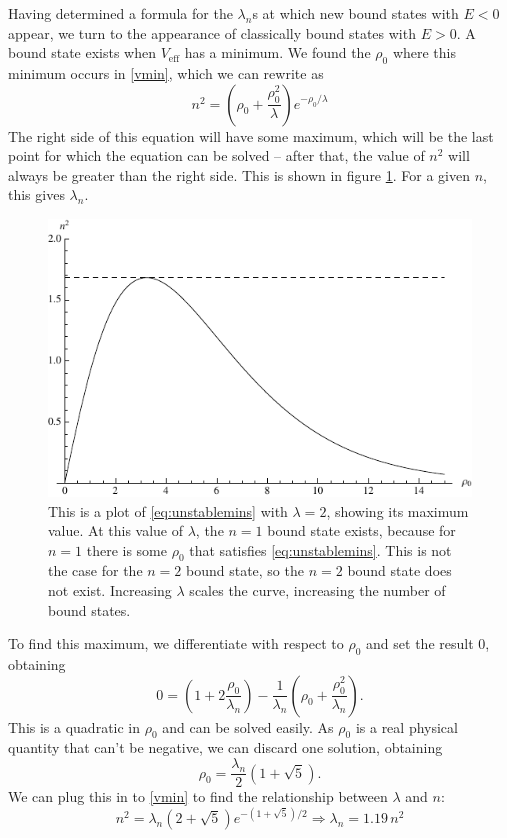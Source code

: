 \documentclass[12pt,twoside]{reedthesis}
\begin{document}
Having determined a formula for the $\lambda_n$s at which new bound states with $E < 0$ appear, we turn to the appearance of classically bound states with $E > 0$. A bound state exists when $V_{\mathrm{eff}}$ has a minimum. We found the $\rho_0$ where this minimum occurs in \eqref {vmin}, which we can rewrite as
\begin{equation}
n^2 = \left( \rho_0 + \frac{\rho_0^2}{\lambda} \right) e^{-\rho_0/\lambda}
\label{eq:unstablemins}
\end{equation}
The right side of this equation will have some maximum, which will be the last point for which the equation can be solved -- after that, the value of $n^2$ will always be greater than the right side. This is shown in figure \ref{fig:unstableveff}. For a given $n$, this gives $\lambda_n$.
\begin{figure}[h]
\centering
\includegraphics{Figures/unstableveff}
\caption[$n^2$ as a function of $\rho_0$]{This is a plot of \eqref{eq:unstablemins} with $\lambda = 2$, showing its maximum value. At this value of $\lambda$, the $n = 1$ bound state exists, because for $n = 1$ there is some $\rho_0$ that satisfies \eqref{eq:unstablemins}. This is not the case for the $n = 2$ bound state, so the $n = 2$ bound state does not exist. Increasing $\lambda$ scales the curve, increasing the number of bound states.}
\label{fig:unstableveff}
\end{figure}
To find this maximum, we differentiate with respect to $\rho_0$ and set the result 0, obtaining
\begin{equation}
0 = (1+2 \frac{\rho_0}{\lambda_n}) - \frac{1}{\lambda_n}(\rho_0 + \frac{\rho_0^2}{\lambda_n})\mbox{.} 
\end{equation}
This is a quadratic in $\rho_0$ and can be solved easily.
As $\rho_0$ is a real physical quantity that can't be negative, we can discard one solution, obtaining
\begin{equation}
\rho_0 = \frac{\lambda_n}{2}(1+\sqrt{5})\mbox{.}
\end{equation}
We can plug this in to \eqref{vmin} to find the relationship between $\lambda$ and $n$:
\begin{equation}
n^2 = \lambda_{n}(2 + \sqrt{5})e^{-(1+ \sqrt{5})/2} \Rightarrow \lambda_n =  1.19\, n^2
\label{eq:unstable}
\end{equation}
\end{document}
